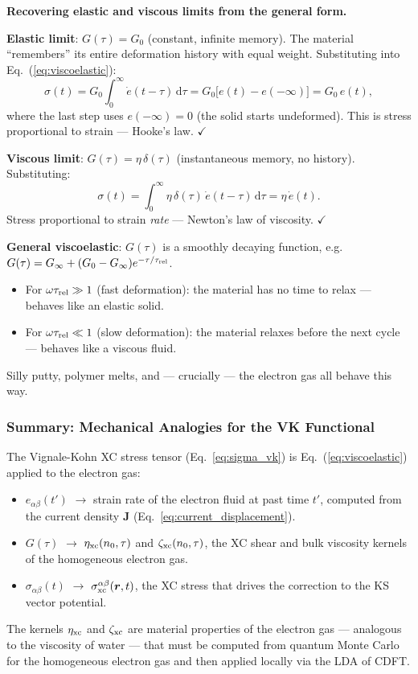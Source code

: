 \documentclass[12pt,letterpaper]{article}
\newcommand{\dd}{\mathrm{d}}
\theoremstyle{definition}
\begin{document}
\begin{derivbox}
\textbf{Recovering elastic and viscous limits from the general form.}

\textbf{Elastic limit}: $G(\tau) = G_0$ (constant, infinite memory).
The material ``remembers'' its entire deformation history with equal
weight. Substituting into Eq.~(\ref{eq:viscoelastic}):
\[
  \sigma(t) = G_0\int_0^\infty \dot{e}(t-\tau)\,\dd\tau
  = G_0\bigl[e(t) - e(-\infty)\bigr]
  = G_0\,e(t),
\]
where the last step uses $e(-\infty)=0$ (the solid starts undeformed).
This is stress proportional to strain --- Hooke's law. $\checkmark$

\textbf{Viscous limit}: $G(\tau) = \eta\,\delta(\tau)$ (instantaneous
memory, no history). Substituting:
\[
  \sigma(t) = \int_0^\infty \eta\,\delta(\tau)\,\dot{e}(t-\tau)\,\dd\tau
  = \eta\,\dot{e}(t).
\]
Stress proportional to strain \emph{rate} --- Newton's law of viscosity.
$\checkmark$

\textbf{General viscoelastic}: $G(\tau)$ is a smoothly decaying
function, e.g.\ $G(\tau) = G_\infty + (G_0-G_\infty)e^{-\tau/\tau_{\rm rel}}$.
\begin{itemize}[noitemsep]
  \item For $\omega\tau_{\rm rel}\gg 1$ (fast deformation): the material
    has no time to relax --- behaves like an elastic solid.
  \item For $\omega\tau_{\rm rel}\ll 1$ (slow deformation): the material
    relaxes before the next cycle --- behaves like a viscous fluid.
\end{itemize}
Silly putty, polymer melts, and --- crucially --- the electron gas all
behave this way.
\end{derivbox}

\subsubsection{Summary: Mechanical Analogies for the VK Functional}

The Vignale-Kohn XC stress tensor (Eq.~\ref{eq:sigma_vk}) is
Eq.~(\ref{eq:viscoelastic}) applied to the electron gas:
\begin{itemize}[noitemsep]
  \item $e_{\alpha\beta}(t')$ $\to$ strain rate of the electron fluid
    at past time $t'$, computed from the current density $\bm{J}$
    (Eq.~\ref{eq:current_displacement}).
  \item $G(\tau)$ $\to$ $\eta_{\rm xc}(n_0,\tau)$ and $\zeta_{\rm xc}(n_0,\tau)$,
    the XC shear and bulk viscosity kernels of the homogeneous electron gas.
  \item $\sigma_{\alpha\beta}(t)$ $\to$ $\sigma_{\rm xc}^{\alpha\beta}(\bm{r},t)$,
    the XC stress that drives the correction to the KS vector potential.
\end{itemize}
The kernels $\eta_{\rm xc}$ and $\zeta_{\rm xc}$ are material properties
of the electron gas --- analogous to the viscosity of water --- that
must be computed from quantum Monte Carlo for the homogeneous electron gas
and then applied locally via the LDA of CDFT.
\end{document}
